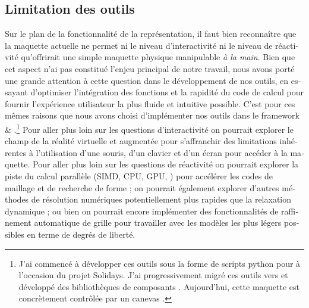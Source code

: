 \begin{otherlanguage}{french}
\subsection*{Limitation des outils}

Sur le plan de la fonctionnalité de la représentation, il faut bien reconnaître que la maquette actuelle ne permet ni le niveau d'interactivité ni le niveau de réactivité qu'offrirait une simple maquette physique manipulable \emph{à la main}. Bien que cet aspect n'ai pas constitué l'enjeu principal de notre travail, nous avons porté une grande attention à cette question dans le développement de nos outils, en essayant d'optimiser l'intégration des fonctions et la rapidité du code de calcul pour fournir l'expérience utilisateur la plus fluide et intuitive possible. C'est pour ces mêmes raisons que nous avons choisi d'implémenter nos outils dans le framework \rhino{} \& \grasshopper{}.\footnote{J'ai commencé à développer ces outils sous la forme de scripts python pour \rhino{} à l'occasion du projet Solidays. J'ai progressivement migré ces outils vers \Csharp{} et développé des bibliothèques de composants \grasshopper{}. Aujourd'hui, cette maquette est concrètement contrôlée par un canevas \grasshopper{}.} Pour aller plus loin sur les questions d'interactivité on pourrait explorer le champ de la réalité virtuelle et augmentée pour s'affranchir des limitations inhérentes à l'utilisation d'une souris, d'un clavier et d'un écran pour accéder à la maquette. Pour aller plus loin sur les questions de réactivité on pourrait explorer la piste du calcul parallèle (SIMD, CPU, GPU, \telp{}) pour accélérer les codes de maillage et de recherche de forme ; on pourrait également explorer d'autres méthodes de résolution numériques potentiellement plus rapides que la relaxation dynamique ; ou bien on pourrait encore implémenter des fonctionnalités de raffinement automatique de grille pour travailler avec les modèles les plus légers possibles en terme de degrés de liberté.


\end{otherlanguage}
